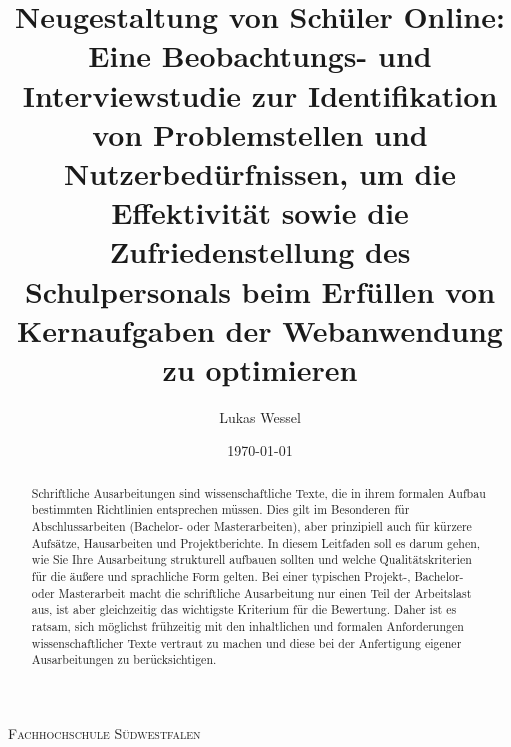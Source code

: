 \documentclass[pdftex,a4paper,abstracton,11pt,parskip=half,bibtotocnumbered]{scrartcl}
\title{Neugestaltung von Schüler Online: Eine Beobachtungs- und Interviewstudie zur Identifikation von Problemstellen und Nutzerbedürfnissen, um die Effektivität sowie die Zufriedenstellung des Schulpersonals beim Erfüllen von Kernaufgaben der Webanwendung zu optimieren}
\author{Lukas Wessel}
\date{\today}
\begin{document}
\makeatletter
\begin{titlepage}
	\centering
	{\scshape\LARGE Fachhochschule Südwestfalen \par}
	\vspace{1cm}
	\vspace{1.5cm}
	{\huge\bfseries \@title\par}
	\vspace{3cm}
	{\Large \@author\par}
	\vspace{1cm}
	{\Large \@date\par}
	\vfill

	\raggedright
\end{titlepage}
\makeatother

\thispagestyle{empty}
\begin{abstract}
Schriftliche Ausarbeitungen sind  wissenschaftliche Texte, die in ihrem formalen Aufbau bestimmten Richtlinien entsprechen müssen.
Dies gilt im Besonderen für Abschlussarbeiten (Bachelor- oder Masterarbeiten), aber prinzipiell auch für kürzere Aufsätze, Hausarbeiten und Projektberichte.
In diesem Leitfaden soll es darum gehen, wie Sie Ihre Ausarbeitung strukturell aufbauen sollten und welche Qualitätskriterien für die äußere und sprachliche Form gelten.
Bei einer typischen Projekt-, Bachelor- oder Masterarbeit macht die schriftliche Ausarbeitung nur einen Teil der Arbeitslast aus, ist aber gleichzeitig das wichtigste Kriterium für die Bewertung.
Daher ist es ratsam, sich möglichst frühzeitig mit den inhaltlichen und formalen Anforderungen wissenschaftlicher Texte vertraut zu machen und diese bei der Anfertigung eigener Ausarbeitungen zu berücksichtigen.
\end{abstract}

\vfill
\tableofcontents
\pagebreak

\setcounter{page}{1}







%

\printbibliography
\end{document}
